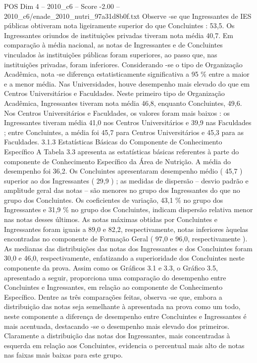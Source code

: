 \begin{textsample}{POS Dim 4 – 2010\_c6 – Score -2.00 – 2010\_c6/enade\_2010\_nutri\_97a31d8b0f.txt}
Observe -se que Ingressantes de IES públicas obtiveram nota ligeiramente superior do que Concluintes : 53,5.
Os Ingressantes oriundos de instituições privadas tiveram nota média 40,7.
Em comparação à média nacional, as notas de Ingressantes e de Concluintes vinculados às instituições públicas foram superiores, ao passo que, nas instituições privadas, foram inferiores.
Considerando -se o tipo de Organização Acadêmica, nota -se diferença estatisticamente significativa a 95 \% entre a maior e a menor média.
Nas Universidades, houve desempenho mais elevado do que em Centros Universitários e Faculdades.
Neste primeiro tipo de Organização Acadêmica, Ingressantes tiveram nota média 46,8, enquanto Concluintes, 49,6.
Nos Centros Universitários e Faculdades, os valores foram mais baixos : os Ingressantes tiveram média 41,0 nos Centros Universitários e 39,9 nas Faculdades ; entre Concluintes, a média foi 45,7 para Centros Universitários e 45,3 para as Faculdades. 3.1.3 Estatísticas Básicas do Componente de Conhecimento Específico A Tabela 3.3 apresenta as estatísticas básicas referentes à parte do componente de Conhecimento Específico da Área de Nutrição.
A média do desempenho foi 36,2.
Os Concluintes apresentaram desempenho médio ( 45,7 ) superior ao dos Ingressantes ( 29,9 ) ; as medidas de dispersão – desvio padrão e amplitude geral das notas – são menores no grupo dos Ingressantes do que no grupo dos Concluintes.
Os coeficientes de variação, 43,1 \% no grupo dos Ingressantes e 31,9 \% no grupo dos Concluintes, indicam dispersão relativa menor nas notas desses últimos.
As notas máximas obtidas por Concluintes e Ingressantes foram iguais a 89,0 e 82,2, respectivamente, notas inferiores àquelas encontradas no componente de Formação Geral ( 97,0 e 96,0, respectivamente ).
As medianas das distribuições das notas dos Ingressantes e dos Concluintes foram 30,0 e 46,0, respectivamente, enfatizando a superioridade dos Concluintes neste componente da prova.
Assim como os Gráficos 3.1 e 3.3, o Gráfico 3.5, apresentado a seguir, proporciona uma comparação do desempenho entre Concluintes e Ingressantes, em relação ao componente de Conhecimento Específico.
Dentre as três comparações feitas, observa -se que, embora a distribuição das notas seja semelhante à apresentada na prova como um todo, neste componente a diferença de desempenho entre Concluintes e Ingressantes é mais acentuada, destacando -se o desempenho mais elevado dos primeiros.
Claramente a distribuição das notas dos Ingressantes, mais concentradas à esquerda em relação aos Concluintes, evidencia o percentual mais alto de notas nas faixas mais baixas para este grupo.

\end{textsample}
